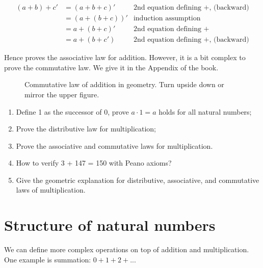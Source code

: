 \documentclass[UTF8]{article}
\begin{document}
\[
\begin{array}{rlr}
(a + b) + c' & = (a + b + c)' & \text{2nd equation defining +, (backward)} \\
             & = (a + (b + c))' & \text{induction assumption} \\
             & = a + (b + c)' & \text{2nd equation defining +} \\
             & = a + (b + c') & \text{2nd equation defining +, (backward)}
\end{array}
\]

Hence proves the associative law for addition. However, it is a bit complex to prove the commutative law. We give it in the Appendix of the book.

\begin{figure}[htbp]
\centering
{}
\caption{Commutative law of addition in geometry. Turn upside down or mirror the upper figure.}
\end{figure}

\begin{Exercise}
\begin{enumerate}
\item Define 1 as the successor of 0, prove $a \cdot 1 = a$ holds for all natural numbers;
\item Prove the distributive law for multiplication;
\item Prove the associative and commutative laws for multiplication.
\item How to verify 3 + 147 = 150 with Peano axioms?
\item Give the geometric explanation for distributive, associative, and commutative laws of multiplication.
\end{enumerate}
\end{Exercise}

\section{Structure of natural numbers}

We can define more complex operations on top of addition and multiplication. One example is summation: $0 + 1 + 2 + ... $
\end{document}
